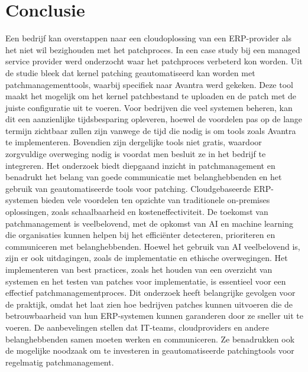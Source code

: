 
\chapter{Conclusie}%
\label{ch:conclusie}


Een bedrijf kan overstappen naar een cloudoplossing van een ERP-provider als het niet wil bezighouden met het patchproces.
In een case study bij een managed service provider werd onderzocht waar het patchproces verbeterd kon worden. Uit de studie bleek dat kernel patching geautomatiseerd kan worden met patchmanagementtools, waarbij specifiek naar Avantra werd gekeken. Deze tool maakt het mogelijk om het kernel patchbestand te uploaden en de patch met de juiste configuratie uit te voeren. Voor bedrijven die veel systemen beheren, kan dit een aanzienlijke tijdsbesparing opleveren, hoewel de voordelen pas op de lange termijn zichtbaar zullen zijn vanwege de tijd die nodig is om tools zoals Avantra te implementeren. Bovendien zijn dergelijke tools niet gratis, waardoor zorgvuldige overweging nodig is voordat men besluit ze in het bedrijf te integreren.
Het onderzoek biedt diepgaand inzicht in patchmanagement en benadrukt het belang van goede communicatie met belanghebbenden en het gebruik van geautomatiseerde tools voor patching. Cloudgebaseerde ERP-systemen bieden vele voordelen ten opzichte van traditionele on-premises oplossingen, zoals schaalbaarheid en kosteneffectiviteit. De toekomst van patchmanagement is veelbelovend, met de opkomst van AI en machine learning die organisaties kunnen helpen bij het efficiënter detecteren, prioriteren en communiceren met belanghebbenden. Hoewel het gebruik van AI veelbelovend is, zijn er ook uitdagingen, zoals de implementatie en ethische overwegingen.
Het implementeren van best practices, zoals het houden van een overzicht van systemen en het testen van patches voor implementatie, is essentieel voor een effectief patchmanagementproces. Dit onderzoek heeft belangrijke gevolgen voor de praktijk, omdat het laat zien hoe bedrijven patches kunnen uitvoeren die de betrouwbaarheid van hun ERP-systemen kunnen garanderen door ze sneller uit te voeren. De aanbevelingen stellen dat IT-teams, cloudproviders en andere belanghebbenden samen moeten werken en communiceren. Ze benadrukken ook de mogelijke noodzaak om te investeren in geautomatiseerde patchingtools voor regelmatig patchmanagement.

